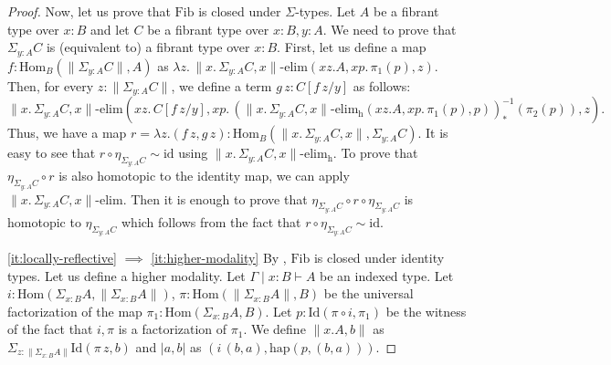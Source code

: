 \documentclass[reqno]{mscs}
\newcommand{\ob}{}
\newcommand{\fs}[1]{\mathrm{#1}}
\newcommand{\Hom}{\fs{Hom}}
\newcommand{\Id}{\fs{Id}}
\newcommand{\sym}[1]{#1^{-1}}
\newcommand{\id}{\fs{id}}
\newcommand{\Fib}{\fs{Fib}}
\numberwithin{figure}{section}
\begin{document}
\begin{proof}
Now, let us prove that $\Fib$ is closed under $\Sigma$-types.
Let $A$ be a fibrant type over $x : B$ and let $C$ be a fibrant type over $x : B, y : A$.
We need to prove that $\Sigma_{y : A} C$ is (equivalent to) a fibrant type over $x : B$.
First, let us define a map $f : \Hom_B(\| \Sigma_{y : A} C \|, A)$ as $\lambda z.\,\| x.\,\Sigma_{y : A} C, x \|\text{-}\fs{elim}(x z. A, x p.\,\pi_1(p), z)$.
Then, for every $z : \| \Sigma_{y : A} C \|$, we define a term $g\,z : C[f\,z/y]$ as follows:
\[ \| x.\,\Sigma_{y : A} C, x \|\text{-}\fs{elim}(x z.\,C[f\,z/y], x p.\,\sym{(\| x.\,\Sigma_{y : A} C, x \|\text{-}\fs{elim_h}(x z. A, x p.\,\pi_1(p), p))}_*(\pi_2(p)), z). \]
Thus, we have a map $r = \lambda z.(f\,z,g\,z) : \Hom_B(\| x.\,\Sigma_{y : A} C, x \|, \Sigma_{y : A} C)$.
It is easy to see that $r \circ \eta_{\Sigma_{y : A} C} \sim \id$ using $\| x.\,\Sigma_{y : A} C, x \|\text{-}\fs{elim_h}$.
To prove that $\eta_{\Sigma_{y : A} C} \circ r$ is also homotopic to the identity map, we can apply $\| x.\,\Sigma_{y : A} C, x \|\text{-}\fs{elim}$.
Then it is enough to prove that $\eta_{\Sigma_{y : A} C} \circ r \circ \eta_{\Sigma_{y : A} C}$ is homotopic to $\eta_{\Sigma_{y : A} C}$ which follows from the fact that $r \circ \eta_{\Sigma_{y : A} C} \sim \id$.

\eqref{it:locally-reflective} $\implies$ \eqref{it:higher-modality}
By , $\Fib$ is closed under identity types.
Let us define a higher modality.
Let $\Gamma \mid x : B \vdash A \ob$ be an indexed type.
Let $i : \Hom(\Sigma_{x : B} A, \| \Sigma_{x : B} A \|)$, $\pi : \Hom(\| \Sigma_{x : B} A \|, B)$ be the universal factorization of the map $\pi_1 : \Hom(\Sigma_{x : B} A, B)$.
Let $p : \Id(\pi \circ i, \pi_1)$ be the witness of the fact that $i,\pi$ is a factorization of $\pi_1$.
We define $\| x.A, b \|$ as $\Sigma_{z : \| \Sigma_{x : B} A \|} \Id(\pi\,z, b)$ and $| a, b |$ as $(i\,(b,a), \fs{hap}(p,(b,a)))$.


\end{proof}
\end{document}
